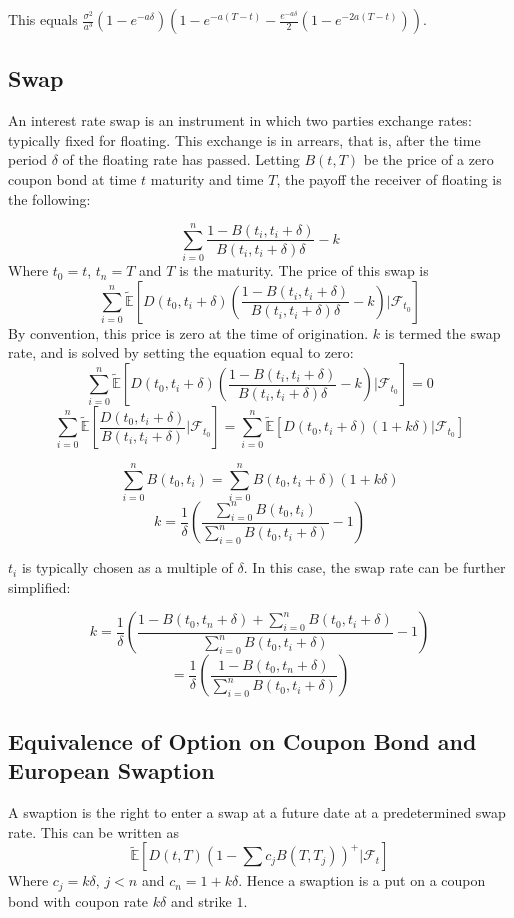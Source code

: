 \documentclass{article}
\theoremstyle{definition}
\begin{document}
This equals \(\frac{\sigma^2}{a^3}\left(1-e^{-a\delta}\right)\left(1-e^{-a(T-t)}-\frac{e^{-a\delta}}{2}\left(1-e^{-2a(T-t)}\right)\right)\).


\subsection{Swap}

An interest rate swap is an instrument in which two parties exchange rates: typically fixed for floating.  This exchange is in arrears, that is, after the time period \(\delta\) of the floating rate has passed.  Letting \(B(t, T)\) be the price of a zero coupon bond at time \(t\) maturity and time \(T\), the payoff the receiver of floating is the following:

\[\sum_{i=0} ^ n \frac{1-B(t_i, t_i+\delta)}{B(t_i, t_i+\delta)\delta}-k\]
Where \(t_0=t\), \(t_n=T\) and \(T\) is the maturity. The price of this swap is
\[\sum_{i=0}^n \mathbb{\tilde{E}}\left[D(t_0, t_i+\delta)\left(\frac{1-B(t_i, t_i+\delta)}{B(t_i, t_i+\delta)\delta}-k\right)|\mathcal{F}_{t_0}\right]\]
By convention, this price is zero at the time of origination.  \(k\) is termed the swap rate, and is solved by setting the equation equal to zero:
\[\sum_{i=0}^n \mathbb{\tilde{E}}\left[D(t_0, t_i+\delta)\left(\frac{1-B(t_i, t_i+\delta)}{B(t_i, t_i+\delta)\delta}-k\right)|\mathcal{F}_{t_0}\right]=0\]
\[\sum_{i=0}^n \mathbb{\tilde{E}}\left[\frac{D(t_0, t_i+\delta)}{B(t_i, t_i+\delta)}|\mathcal{F}_{t_0}\right]=\sum_{i=0}^n \mathbb{\tilde{E}}\left[D(t_0, t_i+\delta)\left(1+k\delta\right)|\mathcal{F}_{t_0}\right]\]

\[\sum_{i=0}^n B(t_0, t_i)=\sum_{i=0}^n B(t_0, t_i+\delta)\left(1+k\delta\right)\]
\[k=\frac{1}{\delta}\left(\frac{\sum_{i=0}^n B(t_0, t_i)}{\sum_{i=0}^n B(t_0, t_i+\delta)}-1\right)\]

\(t_i\) is typically chosen as a multiple of \(\delta\).  In this case, the swap rate can be further simplified:

\[k=\frac{1}{\delta}\left(\frac{1-B(t_0, t_n+\delta)+\sum_{i=0}^n B(t_0, t_i+\delta)}{\sum_{i=0}^n B(t_0, t_i+\delta)}-1\right)\]
\[=\frac{1}{\delta}\left(\frac{1-B(t_0, t_n+\delta)}{\sum_{i=0}^n B(t_0, t_i+\delta)}\right)\]

 \subsection{Equivalence of Option on Coupon Bond and European Swaption}

 A swaption is the right to enter a swap at a future date at a predetermined swap rate.  This can be written as
 \[\mathbb{\tilde{E}} \left[D(t, T)\left(1-\sum c_j B(T, T_j) \right)^+ | \mathcal{F}_t \right]\]
 Where \(c_j=k\delta,\,j<n\) and \(c_n=1+k\delta\).  Hence a swaption is a put on a coupon bond with coupon rate \(k\delta\) and strike \(1\).
\end{document}
